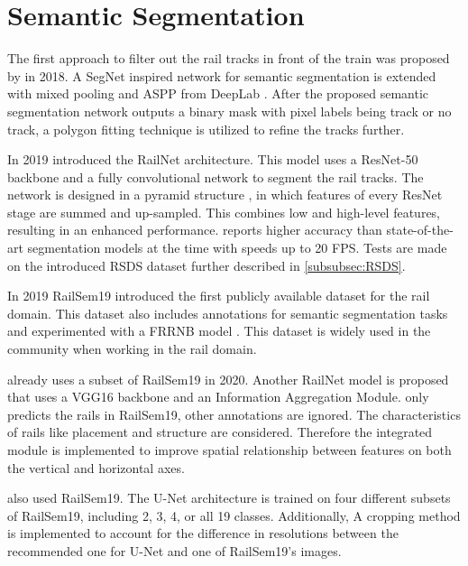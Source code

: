 \section{Semantic Segmentation}
\label{sec:SemanticSegmentation}

The first approach to filter out the rail tracks in front of the train was proposed by \cite{firstRailSegmentation2018} in 2018.
A SegNet \cite{SegNet2017} inspired network for semantic segmentation is extended with mixed pooling \cite{mixedPooling2014} and \ac{ASPP} from DeepLab \cite{deepLab2018}.
After the proposed semantic segmentation network outputs a binary mask with pixel labels being track or no track, a polygon fitting technique is utilized to refine the tracks further.

In 2019 \cite{railNet2019} introduced the RailNet architecture.
This model uses a ResNet-50 \cite{ResNet} backbone and a fully convolutional network \cite{FullyConvolutionalNetworks2015} to segment the rail tracks.
The network is designed in a pyramid structure \cite{FPN2017_two_stage-detector}, in which features of every ResNet stage are summed and up-sampled.
This combines low and high-level features, resulting in an enhanced performance.
\cite{railNet2019} reports higher accuracy than state-of-the-art segmentation models at the time with speeds up to 20 \ac{FPS}.
Tests are made on the introduced \ac{RSDS} dataset further described in \autoref{subsubsec:RSDS}.

In 2019 RailSem19 \cite{railsem19dataset} introduced the first publicly available dataset for the rail domain.
This dataset also includes annotations for semantic segmentation tasks and experimented with a FRRNB model \cite{FRRNBModel2017}.
This dataset is widely used in the community when working in the rail domain.

\cite{RailNet2020} already uses a subset of RailSem19 in 2020.
Another RailNet model is proposed that uses a VGG16 backbone \cite{VGGNet2015} and an Information Aggregation Module.
\cite{RailNet2020} only predicts the rails in RailSem19, other annotations are ignored.
The characteristics of rails like placement and structure are considered.
Therefore the integrated module is implemented to improve spatial relationship between features on both the vertical and horizontal axes.

\cite{automatedSemSeg2022} also used RailSem19.
The U-Net \cite{uNet2015} architecture is trained on four different subsets of RailSem19, including 2, 3, 4, or all 19 classes.
Additionally, A cropping method is implemented to account for the difference in resolutions between the recommended one for U-Net and one of RailSem19's images.

